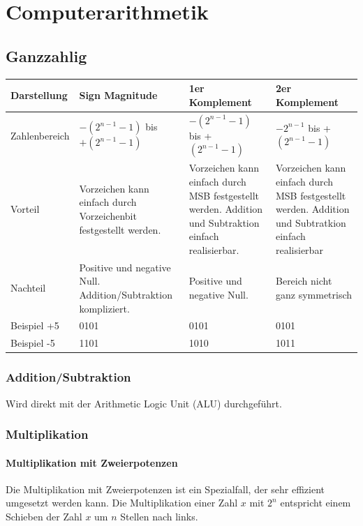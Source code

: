 \section{Computerarithmetik}

\subsection{Ganzzahlig}
\begin{tabular}{|p{3cm}|p{4.5cm}|p{4.5cm}|p{4.5cm}|}
	\hline
	Darstellung & Sign Magnitude & 1er Komplement & 2er Komplement\\
	\hline
	Zahlenbereich & $-(2^{n-1}-1)$ bis $+(2^{n-1}-1)$ & $-(2^{n-1}-1)$ bis +$(2^{n-1}-1)$ & $-2^{n-1}$ bis +$(2^{n-1}-1)$\\
	\hline
	Vorteil & Vorzeichen kann einfach durch Vorzeichenbit festgestellt werden. & Vorzeichen kann einfach durch MSB festgestellt werden. Addition und Subtraktion einfach realisierbar. & Vorzeichen kann einfach durch MSB festgestellt werden. Addition und Subtratkion einfach realisierbar \\ 
	\hline
	Nachteil & Positive und negative Null. Addition/Subtraktion kompliziert. & Positive und negative Null. & Bereich nicht ganz symmetrisch\\
	\hline
	Beispiel +5 & 0101 & 0101 & 0101 \\
	Beispiel -5 & 1101 & 1010 & 1011 \\
	\hline
\end{tabular}

\subsubsection{Addition/Subtraktion}
Wird direkt mit der Arithmetic Logic Unit (ALU) durchgeführt.

\subsubsection{Multiplikation}
\paragraph {Multiplikation mit Zweierpotenzen}
Die Multiplikation mit Zweierpotenzen ist ein Spezialfall, der sehr effizient umgesetzt werden kann. Die Multiplikation einer Zahl $x$ mit $2^n$ entspricht einem Schieben der Zahl $x$ um $n$ Stellen nach links.

